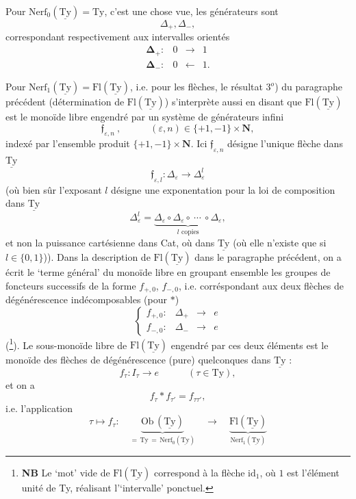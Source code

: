 \documentclass[11pt]{article}
\newcommand{\printedpage}[1]{\if\relax\detokenize{#1}\relax\else\marginpar{\raggedright\footnotesize p.~#1}\fi}
\newcommand{\msp}[1]{\marginpar{\raggedright\footnotesize [#1]}}
\newcommand{\uTy}{\underline{\mathrm{Ty}}}
\begin{document}
Pour $\mathrm{Nerf}_0(\uTy) = \mathrm{Ty}$, c'est une chose vue, les générateurs sont
\[
\Delta_+,\Delta_-,
\]
correspondant respectivement aux intervalles orientés
\[
\begin{array}{rccc}
\boldsymbol{\Delta}_+ : & 0 & \longrightarrow & 1\\[4pt]
\boldsymbol{\Delta}_- : & 0 & \longleftarrow & 1.
\end{array}
\]

\msp{page 50$'$}
Pour $\mathrm{Nerf}_1(\uTy) = \mathrm{Fl}(\uTy)$, i.e. pour les flèches, le résultat $3^o$) du paragraphe précédent (détermination de $\mathrm{Fl}(\uTy)$) s'interprète aussi en disant que $\mathrm{Fl}(\uTy)$ est le monoïde libre engendré par un système de générateurs infini
\[
\mathfrak{f}_{\varepsilon,n}\ , \qquad\quad (\varepsilon,n)\in\{+1,-1\}\times\mathbf{N},
\]
indexé par l'ensemble produit $\{+1,-1\}\times\mathbf{N}$. Ici $\mathfrak{f}_{\varepsilon,n}$ désigne l'unique flèche dans $\uTy$
\[
\mathfrak{f}_{\varepsilon,l} : \Delta_\varepsilon \longrightarrow \Delta^l_\varepsilon
\]
(où bien sûr l'exposant $l$ désigne une exponentation pour la loi de composition dans $\uTy$
\[
\Delta^l_\varepsilon = \underbrace{\Delta_\varepsilon\circ\Delta_\varepsilon\circ\ \cdots\ \circ\Delta_\varepsilon}_{l\text{ copies}},
\]
et non la puissance cartésienne dans Cat, où dans $\uTy$ (où elle n'existe que si $l\in\{0,1\}$)). %
Dans la description de $\mathrm{Fl}(\uTy)$ dans le paragraphe précédent, on a écrit le `terme général' du monoïde libre en groupant ensemble les groupes de foncteurs successifs de la forme $f_{+,0}$, $f_{-,0}$, i.e. corréspondant aux deux flèches de dégénérescence indécomposables (pour $*$) %
\[
\left\{
\begin{array}{lccc}
f_{+,0} : & \Delta_+ & \longrightarrow & e\\[4pt]
f_{-,0} : & \Delta_- & \longrightarrow & e
\end{array}
\right.
\]
(\footnote[15]{\textbf{NB} Le `mot' vide de $\mathrm{Fl}(\uTy)$ correspond à la flèche $\mathrm{id}_1$, où $1$ est l'élément unité de Ty, réalisant l'`intervalle' ponctuel.}). Le sous-monoïde libre de $\mathrm{Fl}(\uTy)$ engendré par ces deux éléments est le monoïde des flèches de dégénérescence (pure) quelconques
\printedpage{35}
\msp{page 51}
dans $\uTy$ :
\[
f_\tau : I_\tau \longrightarrow e \qquad\quad (\tau\in\mathrm{Ty}),
\]
et on a
\[
f_\tau * f_{\tau'} = f_{\tau\tau'},
\]
i.e. l'application
\[
\tau \longmapsto f_\tau :\quad \underbrace{\mathrm{Ob}\,(\uTy)}_{=\,\mathrm{Ty}\,=\,\mathrm{Nerf}_0(\uTy)} \quad\longrightarrow\quad \underbrace{\mathrm{Fl}(\uTy)}_{\mathrm{Nerf}_1(\uTy)}
\]
\end{document}
